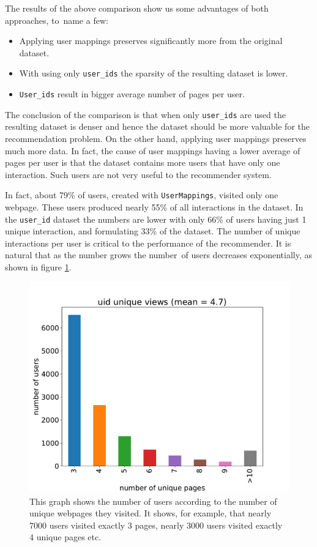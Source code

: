 The results of the above comparison show us some advantages of both approaches, to~name a few:
\begin{itemize}
\item Applying user mappings preserves significantly more from the original dataset.
\item With using only \texttt{user\_ids} the sparsity of the resulting dataset is lower.
\item \texttt{User\_ids} result in bigger average number of pages per user.
\end{itemize}
The conclusion of the comparison is that when only \texttt{user\_ids} are used the resulting dataset is denser and hence the dataset should be more valuable for the recommendation problem. On the other hand, applying user mappings preserves much more data. In fact, the cause of user mappings having a lower average of pages per user is that the dataset contains more users that have only one interaction. Such users are not very useful to the recommender system. 

In fact, about 79\% of users, created with \texttt{UserMappings}, visited only one webpage. These users produced nearly 55\% of all interactions in the dataset. In the \texttt{user\_id} dataset the numbers are lower with only 66\% of users having just 1 unique interaction, and formulating 33\% of the dataset. The number of unique interactions per user is critical to the performance of the recommender. It is natural that as the number grows the number~of users decreases exponentially, as shown in figure \ref{uid_3_pages}.


\begin{figure}[H]
    \centering
    \includegraphics[scale=0.5]{obrazky-figures/uid_3_pages.pdf}
    \caption{This graph shows the number of users according to the number of unique webpages they visited. It shows, for example, that nearly 7000 users visited exactly 3 pages, nearly 3000 users visited exactly 4 unique pages etc.}
    \label{uid_3_pages}
\end{figure}

